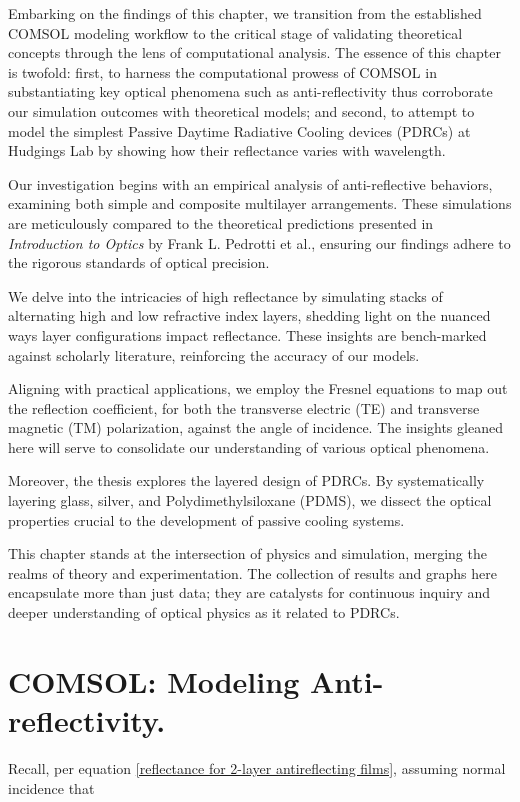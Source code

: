Embarking on the findings of this chapter, we transition from the established COMSOL modeling workflow to the critical stage of validating theoretical concepts through the lens of computational analysis. The essence of this chapter is twofold: first, to harness the computational prowess of COMSOL in substantiating key optical phenomena such as anti-reflectivity thus corroborate our simulation outcomes with theoretical models; and second, to attempt to model the simplest Passive Daytime Radiative Cooling devices (PDRCs) at Hudgings Lab by showing how their reflectance varies with wavelength.

Our investigation begins with an empirical analysis of anti-reflective behaviors, examining both simple and composite multilayer arrangements. These simulations are meticulously compared to the theoretical predictions presented in \emph{Introduction to Optics} by Frank L. Pedrotti et al., ensuring our findings adhere to the rigorous standards of optical precision.

We delve into the intricacies of high reflectance by simulating stacks of alternating high and low refractive index layers, shedding light on the nuanced ways layer configurations impact reflectance. These insights are bench-marked against scholarly literature, reinforcing the accuracy of our models.

Aligning with practical applications, we employ the Fresnel equations to map out the reflection coefficient, for both the transverse electric (TE) and transverse magnetic (TM) polarization, against the angle of incidence. The insights gleaned here will serve to consolidate our understanding of various optical phenomena.

Moreover, the thesis explores the layered design of PDRCs. By systematically layering glass, silver, and Polydimethylsiloxane (PDMS), we dissect the optical properties crucial to the development of passive cooling systems.

This chapter stands at the intersection of physics and simulation, merging the realms of theory and experimentation. The collection of results and graphs here encapsulate more than just data; they are catalysts for continuous inquiry and deeper understanding of optical physics as it related to PDRCs.

\section{COMSOL: Modeling Anti-reflectivity.}
Recall, per equation \ref{reflectance for 2-layer antireflecting films}, assuming normal incidence that

